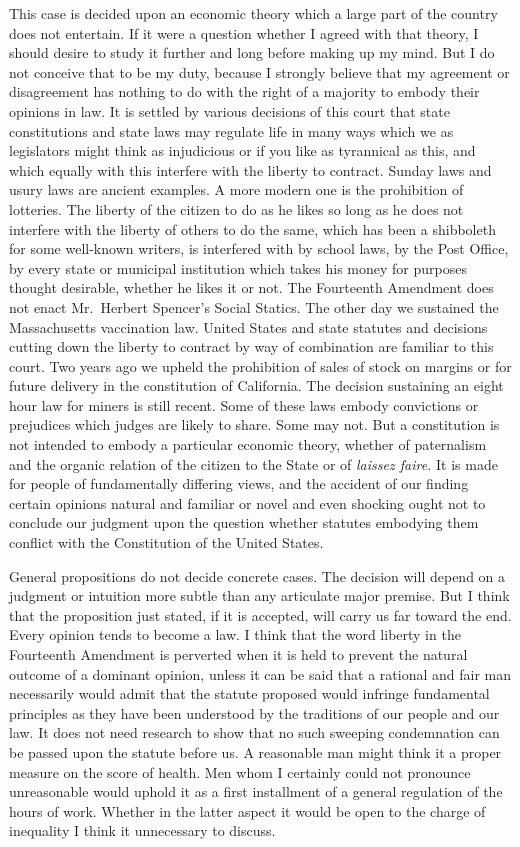 \documentclass[
  letterpaper,
  11pt,
  DIV=9,
  openright]{scrbook}
\begin{document}
This case is decided upon an economic theory which a large part of the
country does not entertain. If it were a question whether I agreed with
that theory, I should desire to study it further and long before making
up my mind. But I do not conceive that to be my duty, because I strongly
believe that my agreement or disagreement has nothing to do with the
right of a majority to embody their opinions in law. It is settled by
various decisions of this court that state constitutions and state laws
may regulate life in many ways which we as legislators might think as
injudicious or if you like as tyrannical as this, and which equally with
this interfere with the liberty to contract. Sunday laws and usury laws
are ancient examples. A more modern one is the prohibition of lotteries.
The liberty of the citizen to do as he likes so long as he does not
interfere with the liberty of others to do the same, which has been a
shibboleth for some well-known writers, is interfered with by school
laws, by the Post Office, by every state or municipal institution which
takes his money for purposes thought desirable, whether he likes it or
not. The Fourteenth Amendment does not enact Mr.~Herbert Spencer's
Social Statics. The other day we sustained the Massachusetts vaccination
law. United States and state statutes and decisions cutting down the
liberty to contract by way of combination are familiar to this court.
Two years ago we upheld the prohibition of sales of stock on margins or
for future delivery in the constitution of California. The decision
sustaining an eight hour law for miners is still recent. Some of these
laws embody convictions or prejudices which judges are likely to share.
Some may not. But a constitution is not intended to embody a particular
economic theory, whether of paternalism and the organic relation of the
citizen to the State or of \emph{laissez faire.} It is made for people
of fundamentally differing views, and the accident of our finding
certain opinions natural and familiar or novel and even shocking ought
not to conclude our judgment upon the question whether statutes
embodying them conflict with the Constitution of the United States.

General propositions do not decide concrete cases. The decision will
depend on a judgment or intuition more subtle than any articulate major
premise. But I think that the proposition just stated, if it is
accepted, will carry us far toward the end. Every opinion tends to
become a law. I think that the word liberty in the Fourteenth Amendment
is perverted when it is held to prevent the natural outcome of a
dominant opinion, unless it can be said that a rational and fair man
necessarily would admit that the statute proposed would infringe
fundamental principles as they have been understood by the traditions of
our people and our law. It does not need research to show that no such
sweeping condemnation can be passed upon the statute before us. A
reasonable man might think it a proper measure on the score of health.
Men whom I certainly could not pronounce unreasonable would uphold it as
a first installment of a general regulation of the hours of work.
Whether in the latter aspect it would be open to the charge of
inequality I think it unnecessary to discuss.
\end{document}
